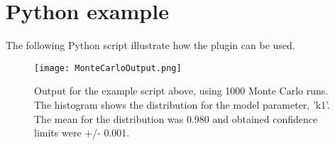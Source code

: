 \section{Python example}
The following Python script illustrate how the plugin can be used. 

\begin{singlespace}

\end{singlespace}

\begin{sidewaysfigure}
\centering
\texttt{[image: MonteCarloOutput.png]}
\caption{Output for the example script above, using 1000 Monte Carlo runs. The histogram shows the distribution for the model parameter, 'k1'. The mean for the distribution was 0.980 and  obtained confidence limits were +/- 0.001.}
\label{fig:mcFig}
\end{sidewaysfigure}






